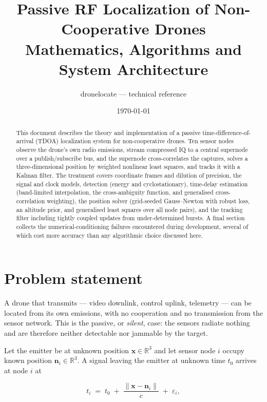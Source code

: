 \documentclass[11pt,a4paper]{article}
\title{\textbf{Passive RF Localization of Non-Cooperative Drones}\\[2mm]
       \large Mathematics, Algorithms and System Architecture}
\author{\normalsize dronelocate --- technical reference}
\date{\normalsize\today}
\newcommand{\R}{\mathbb{R}}
\begin{document}
\maketitle

\begin{abstract}
\noindent
This document describes the theory and implementation of a passive
time-difference-of-arrival (TDOA) localization system for non-cooperative
drones. Ten sensor nodes observe the drone's own radio emissions, stream
compressed IQ to a central supernode over a publish/subscribe bus, and the
supernode cross-correlates the captures, solves a three-dimensional position
by weighted nonlinear least squares, and tracks it with a Kalman filter. The
treatment covers coordinate frames and dilution of precision, the signal and
clock models, detection (energy and cyclostationary), time-delay estimation
(band-limited interpolation, the cross-ambiguity function, and generalised
cross-correlation weighting), the position solver (grid-seeded Gauss--Newton
with robust loss, an altitude prior, and generalised least squares over all
node pairs), and the tracking filter including tightly coupled updates from
under-determined bursts. A final section collects the numerical-conditioning
failures encountered during development, several of which cost more accuracy
than any algorithmic choice discussed here.
\end{abstract}

\tableofcontents

\section{Problem statement}

A drone that transmits --- video downlink, control uplink, telemetry --- can
be located from its own emissions, with no cooperation and no transmission
from the sensor network. This is the passive, or \emph{silent}, case: the
sensors radiate nothing and are therefore neither detectable nor jammable by
the target.

Let the emitter be at unknown position $\mathbf{x}\in\R^3$ and let sensor
node $i$ occupy known position $\mathbf{n}_i\in\R^3$. A signal leaving the
emitter at unknown time $t_0$ arrives at node $i$ at

\begin{equation}
  t_i \;=\; t_0 \;+\; \frac{\lVert \mathbf{x}-\mathbf{n}_i\rVert}{c}
        \;+\; \varepsilon_i ,
  \label{eq:arrival}
\end{equation}
\end{document}
